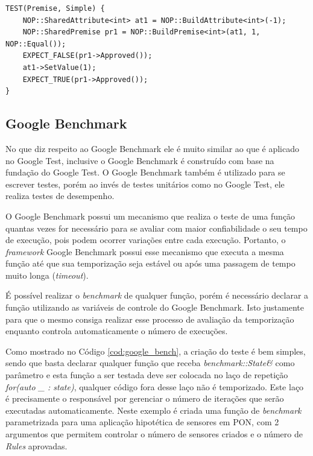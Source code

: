 \begin{lstlisting}[caption = {Caso de teste com Google Test}, float=htb,
source = {Autoria própria}, label = {cod:test_case}]
TEST(Premise, Simple) {
    NOP::SharedAttribute<int> at1 = NOP::BuildAttribute<int>(-1);
    NOP::SharedPremise pr1 = NOP::BuildPremise<int>(at1, 1, NOP::Equal());
    EXPECT_FALSE(pr1->Approved());
    at1->SetValue(1);
    EXPECT_TRUE(pr1->Approved());
}
\end{lstlisting}

\subsection{Google Benchmark}

No que diz respeito ao Google Benchmark ele é muito similar ao que é aplicado no
Google Test, inclusive o Google Benchmark é construído com base na fundação do
Google Test. O Google Benchmark também é utilizado para se escrever testes,
porém ao invés de testes unitários como no Google Test, ele realiza testes de
desempenho.

O Google Benchmark possui um mecanismo que realiza o teste de uma função quantas
vezes for necessário para se avaliar com maior confiabilidade o seu tempo de
execução, pois podem ocorrer variações entre cada execução. Portanto, o
\textit{framework} Google Benchmark possui esse mecanismo que executa a mesma
função até que sua temporização seja estável ou após uma passagem de tempo muito
longa (\textit{timeout}).

É possível realizar o \textit{benchmark} de qualquer função, porém é necessário
declarar a função utilizando as variáveis de controle do Google Benchmark. Isto
justamente para que o mesmo consiga realizar esse processo de avaliação da
temporização enquanto controla automaticamente o número de execuções.

Como mostrado no Código \ref{cod:google_bench}, a criação do teste é bem
simples, sendo que basta declarar qualquer função que receba
\textit{benchmark::State\&} como parâmetro e esta função a ser testada deve ser
colocada no laço de repetição \textit{for(auto \_ : state)}, qualquer código
fora desse laço não é temporizado. Este laço é precisamente o responsável por
gerenciar o número de iterações que serão executadas automaticamente. Neste
exemplo é criada uma função de \textit{benchmark} parametrizada para uma
aplicação hipotética de sensores em PON, com 2 argumentos que permitem controlar
o número de sensores criados e o número de \textit{Rules} aprovadas.

